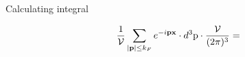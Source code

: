 
\begin{frame}{Calculating integral}

  \begin{equation}
    \begin{gathered}
      \frac{1}{\mathcal{V}} \sum_{\abs{\textbf{p}}\leq k_F} e^{- i \textbf{p}\textbf{x}}
      \cdot d^3 \text{p} \cdot \frac{\mathcal{V}}{(2 \pi)^3} =
    \end{gathered}
  \end{equation}

\end{frame}
